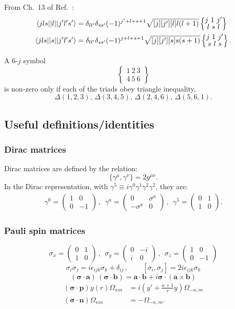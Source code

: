 \documentclass[10pt,twocolumn,a4paper]{article}%
\newcommand{\bra}[1]{\ensuremath{\langle #1|}}	%
\newcommand{\ket}[1]{\ensuremath{|#1\rangle}}
\newcommand{\matr}[4]{\ensuremath{\begin{pmatrix}#1&#2\\#3&#4\end{pmatrix}}}	%
\newcommand{\sixjs}[6]{\renewcommand\arraystretch{0.75}\ensuremath{\begin{Bmatrix}#1~#2~#3\\#4~#5~#6\end{Bmatrix}}}	%
\renewcommand{\v}[1]{\ensuremath{\boldsymbol{#1}}}		%
\newcommand{\be}{\begin{equation}}
\newcommand{\ee}{\end{equation}}
\newcommand{\g}{\ensuremath{\gamma}}
\newcommand{\s}{\ensuremath{\sigma}}
\renewcommand{\k}{\ensuremath{\kappa}}
\begin{document}
From Ch.~13 of Ref.~\cite{Varshalovich1988}:
\begin{align}\notag
\bra{jls}|l|\ket{j'l's'}& =\delta_{ll'}\delta_{ss'}(-1)^{j'+l+s+1}\sqrt{[j][j'][l]l(l+1)}\sixjs{j}{1}{j'}{l}{s}{l}\\
\bra{jls}|s|\ket{j'l's'}&= \delta_{ll'}\delta_{ss'}(-1)^{j+l+s+1}\sqrt{[j][j'][s]s(s+1)}\sixjs{j}{1}{j'}{s}{l}{s}.
\end{align}


A 6-$j$ symbol
\be
\sixjs{1}{2}{3}{4}{5}{6}
\ee
is non-zero only if each of the triads obey triangle inequality,
\be
\Delta(1,2,3),\, \Delta(3,4,5),\, \Delta(2,4,6),\, \Delta(5,6,1).
\ee



\subsection{Useful definitions/identities}

\subsubsection*{Dirac matrices}\label{sec:DiracMatrix}

Dirac matrices are defined by the relation:
\be
\{\g^\mu,\g^\nu\} = 2g^{\mu\nu}.
\ee
In the Dirac representation, with $\g^5 \equiv i\g^0\g^1\g^2\g^2$, they are:
\begin{multline}
\g^0 = \matr{1}{0}{0}{-1} \, , ~~
\g^a = \matr{0}{\s^a}{-\s^a}{0} \, , ~~
\g^5 = \matr{0}{1}{1}{0}.
\end{multline}

\subsubsection*{Pauli spin matrices}
\be
\s_x = \matr{0}{1}{1}{0} \, , ~~
\s_y = \matr{0}{-i}{i}{0} \, , ~~
\s_z = \matr{1}{0}{0}{-1}
\ee
\be
\s_i\s_j = i\epsilon_{ijk}\s_k + \delta_{ij} \, , \qquad
[\s_i,\s_j] = 2i\epsilon_{ijk}\s_k
\ee
\be
(\v{\s}\cdot\v{a})\,(\v{\s}\cdot\v{b}) = \v{a}\cdot\v{b} + i\v{\s}\cdot(\v{a}\times\v{b})
\ee
\begin{align}
(\v{\s}\cdot\v{p}) y(r)\Omega_{\k m} &= i\left(y' + \frac{\k+1}{r}y\right)\Omega_{-\k, m} \\
(\v{\s}\cdot\v{n}) \Omega_{\k m} &= -\Omega_{-\k, m}.
\end{align}
\end{document}
